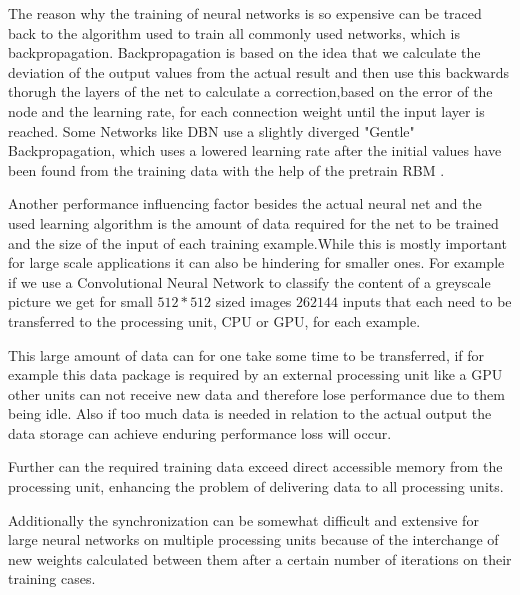 \documentclass[conference]{IEEEtran}
\begin{document}

The reason why the training of neural networks is so expensive can be traced back to the algorithm used to train all commonly used networks, which is backpropagation. Backpropagation is based on the idea that we calculate the deviation of the output values from the actual result and then use this backwards thorugh the layers of the net to calculate a correction,based on the error of the node and the learning rate, for each connection weight until the input layer is reached\cite{riedmiller1993direct}. Some Networks like DBN use a slightly 
diverged "Gentle" Backpropagation, which uses a lowered learning rate after the initial values have been found from the training data with the help of the pretrain RBM \cite{PattersonGibson17}.


Another performance influencing factor besides the actual neural net and the used learning algorithm is the amount of data required for the net to be trained and the size of the input of each training example.While this is mostly important for large scale applications it can also be hindering for smaller ones. For example if we use a Convolutional Neural Network to classify the content of a greyscale picture we get for small $512*512$ sized images $262144$ inputs that each need to be transferred to the processing unit, CPU or GPU, for each example.

This large amount of data can for one take some time to be transferred, if for example this data package is required by an external processing unit like a GPU other units can not  receive new data and therefore lose performance due to them being idle. Also if too much data is needed in relation to the actual output the data storage can achieve enduring performance loss will occur.  

Further can the required training data exceed direct accessible memory from the processing unit, enhancing the problem of delivering data to all processing units.

Additionally the synchronization can be somewhat difficult and extensive for large neural networks on multiple processing units because of the interchange of new weights calculated between them after a certain number of iterations on their training cases.

\end{document}
